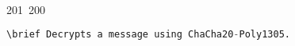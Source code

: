 201~200~\documentclass{article}
\begin{document}
\begin{lstlisting}[language=Python, caption=Decrypting a Message with ChaCha20-Poly1305]
	                                                                                                                                                                                                                                                                                                	                                                                                                                                        	    	                                                                                                	                                                                                                                                                                                                                                                                                                                                	                                                                        	                                                                        	                                                                                                                                        	                                                                                                                                                                                                                        	                                                                                                                            	                                                                	                                                                                                                                                    \brief Decrypts a message using ChaCha20-Poly1305.

\end{lstlisting}
\end{document}
